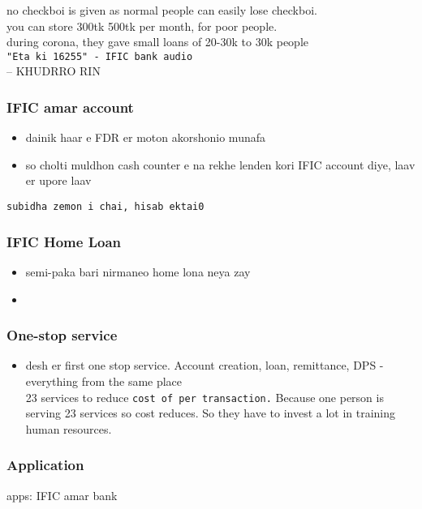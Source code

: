 \documentclass[11pt]{article}
\begin{document}
no checkboi is given as normal people can easily lose checkboi.\\
you can store 300tk 500tk per month, for poor people.\\

during corona, they gave small loans of 20-30k to 30k people\\
\texttt{"Eta ki 16255" - IFIC bank audio}\\

-- KHUDRRO RIN\\
\subsubsection{IFIC amar account}
\label{sec:org108bf39}
\begin{itemize}
\item dainik haar e FDR er moton akorshonio munafa\\
\item so cholti muldhon cash counter e na rekhe lenden kori IFIC account diye, laav er upore laav\\
\end{itemize}


\texttt{subidha zemon i chai, hisab ektai0}\\
\subsubsection{IFIC Home Loan}
\label{sec:org2e9a4f8}
\begin{itemize}
\item semi-paka bari nirmaneo home lona neya zay\\
\item 
\end{itemize}
\subsubsection{One-stop service}
\label{sec:org4b21d88}
\begin{itemize}
\item desh er first one stop service. Account creation, loan, remittance, DPS - everything from the same place\\

23 services to reduce \texttt{cost of per transaction.} Because one person is serving 23 services so cost reduces. So they have to invest a lot in training human resources.\\
\end{itemize}
\subsubsection{Application}
\label{sec:org303c81c}
apps: IFIC amar bank\\
\end{document}
